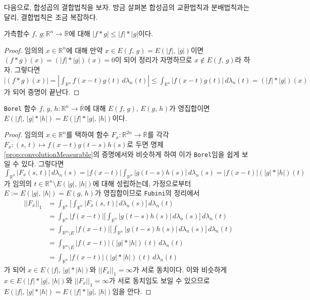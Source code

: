 다음으로, 합성곱의 결합법칙을 보자. 방금 살펴본 합성곱의 교환법칙과 분배법칙과는 달리, 결합법칙은 조금 복잡하다.

\begin{theorem}\label{thm:convolutionIneq}
    가측함수 $f,\,g:\mathbb{R}^n\to\overline{\mathbb{R}}$에 대해 $|f*g|\leq|f|*|g|$이다.
\end{theorem}

\begin{proof}
    임의의 $x\in\mathbb{R}^n$에 대해 만약 $x\in E(f,\,g)=E(|f|,\,|g|)$이면 $(f*g)(x)=(|f|*|g|)(x)=0$이 되어 정리가 자명하므로 $x\notin E(f,\,g)$라 하자. 그렇다면 $|(f*g)(x)|=|\int_{\mathbb{R}^n}f(x-t)g(t)\,d\lambda_n(t)|\leq\int_{\mathbb{R}^n}|f(x-t)g(t)|\,d\lambda_n(t)=(|f|*|g|)(x)$가 되어 증명이 끝난다.
\end{proof}

\begin{lemma}
    \texttt{Borel} 함수 $f,\,g,\,h:\mathbb{R}^n\to\overline{\mathbb{R}}$에 대해 $E(f,\,g),\,E(g,\,h)$가 영집합이면 $E(|f|,\,|g|*|h|)=E(|f|*|g|,\,|h|)$이다.
\end{lemma}

\begin{proof}
    임의의 $x\in\mathbb{R}^n$를 택하여 함수 $F_x:\mathbb{R}^{2n}\to\overline{\mathbb{R}}$를 각각 $F_x:(s,\,t)\mapsto f(x-t)g(t-s)h(s)$로 두면 명제 \ref{prop:convolutionMeasurable}의 증명에서와 비슷하게 하여 이가 \texttt{Borel}임을 쉽게 보일 수 있다. 그렇다면 $\int_{\mathbb{R}^n}|F_x(s,\,t)|\,d\lambda_n(s)=|f(x-t)|\int_{\mathbb{R}^n}|g(t-s)h(s)|\,d\lambda_n(s)=|f(x-t)|(|g|*|h|)(t)$가 임의의 $t\in\mathbb{R}^n\setminus E(|g|,\,|h|)$에 대해 성립하는데, 가정으로부터 $E:=E(|g|,\,|h|)=E(g,\,h)$가 영집합이므로 \texttt{Fubini}의 정리에서 
    \begin{align*}
        ||F_x||_1&=\int_{\mathbb{R}^n}\bigg[\int_{\mathbb{R}^n}|F_x(s,\,t)|\,d\lambda_n(s)\bigg]\,d\lambda_n(t)\\
        &=\int_{\mathbb{R}^n}|f(x-t)|\bigg[\int_{\mathbb{R}^n}|g(t-s)h(s)|\,d\lambda_n(s)\bigg]\,d\lambda_n(t)\\
        &=\int_{\mathbb{R}^n\setminus E}|f(x-t)|\bigg[\int_{\mathbb{R}^n}|g(t-s)h(s)|\,d\lambda_n(s)\bigg]\,d\lambda_n(t)\\
        &=\int_{\mathbb{R}^n\setminus E}|f(x-t)|(|g|*|h|)(t)\,d\lambda_n(t)\\
        &=\int_{\mathbb{R}^n}|f(x-t)|(|g|*|h|)(t)\,d\lambda_n(t)
    \end{align*}
    가 되어 $x\in E(|f|,\,|g|*|h|)$와 $||F_x||_1=\infty$가 서로 동치이다. 이와 비슷하게 $x\in E(|f|*|g|,\,|h|)$와 $||F_x||_1=\infty$가 서로 동치임도 보일 수 있으므로 $E(|f|,\,|g|*|h|)=E(|f|*|g|,\,|h|)$임을 안다.
\end{proof}

